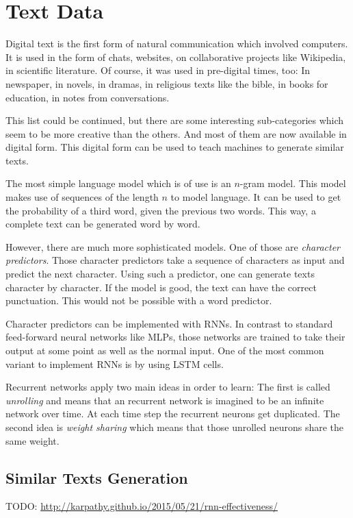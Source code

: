
\section{Text Data}%
\label{sec:text-generation}%

Digital text is the first form of natural communication which involved
computers. It is used in the form of chats, websites, on collaborative projects
like Wikipedia, in scientific literature. Of course, it was used in pre-digital
times, too: In newspaper, in novels, in dramas, in religious texts like the
bible, in books for education, in notes from conversations.

This list could be continued, but there are some interesting sub-categories
which seem to be more creative than the others. And most of them are now
available in digital form. This digital form can be used to teach machines
to generate similar texts.

The most simple language model which is of use is an $n$-gram model. This model
makes use of sequences of the length $n$ to model language. It can be used to
get the probability of a third word, given the previous two words. This way,
a complete text can be generated word by word.

However, there are much more sophisticated models. One of those are
\textit{character predictors}. Those character predictors take a sequence of
characters as input and predict the next character. Using such a predictor, one
can generate texts character by character. If the model is good, the text can
have the correct punctuation. This would not be possible with a word predictor.

Character predictors can be implemented with \glspl{RNN}. In contrast to
standard feed-forward neural networks like \glspl{MLP}, those networks are
trained to take their output at some point as well as the normal input. One of
the most common variant to implement \glspl{RNN} is by using \gls{LSTM} cells.

Recurrent networks apply two main ideas in order to learn: The first is called
\textit{unrolling} and means that an recurrent network is imagined to be
an infinite network over time. At each time step the recurrent neurons get
duplicated. The second idea is \textit{weight sharing} which means that those
unrolled neurons share the same weight.


\subsection{Similar Texts Generation}
TODO: \href{http://karpathy.github.io/2015/05/21/rnn-effectiveness/}{http://karpathy.github.io/2015/05/21/rnn-effectiveness/}

